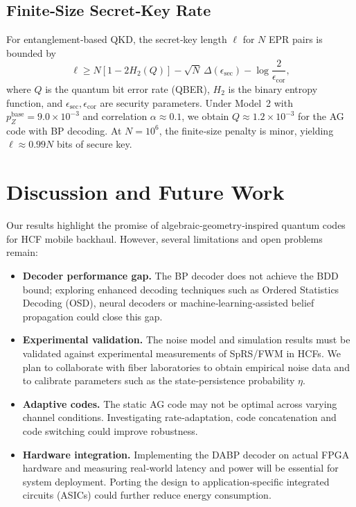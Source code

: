 \documentclass[conference]{IEEEtran}
\begin{document}
    \subsection{Finite‑Size Secret‑Key Rate}
    For entanglement‑based QKD, the secret‑key length $\ell$ for $N$ EPR pairs is bounded by
    \begin{equation}
    \ell \ge N[1-2H_2(Q)]-\sqrt{N}\,\Delta(\epsilon_{\mathrm{sec}}) - \log \frac{2}{\epsilon_{\mathrm{cor}}},
    \end{equation}
    where $Q$ is the quantum bit error rate (QBER), $H_2$ is the binary entropy function, and $\epsilon_{\mathrm{sec}}, 
\epsilon_{\mathrm{cor}}$ are security parameters.  Under Model 2 with $p_Z^{\mathrm{base}}=9.0\times 10^{-3}$ and 
correlation $\alpha\approx 0.1$, we obtain $Q\approx 1.2\times 10^{-3}$ for the AG code with BP decoding.  At $N=10^6$, 
the finite‑size penalty is minor, yielding $\ell\approx 0.99N$ bits of secure key.

    \section{Discussion and Future Work}

    Our results highlight the promise of algebraic‑geometry‑inspired quantum codes for HCF mobile backhaul.  However, 
several limitations and open problems remain:

    \begin{itemize}[leftmargin=*]
      \item \textbf{Decoder performance gap.}  The BP decoder does not achieve the BDD bound; exploring enhanced 
decoding techniques such as Ordered Statistics Decoding (OSD), neural decoders or machine‑learning‑assisted belief 
propagation could close this gap.
      \item \textbf{Experimental validation.}  The noise model and simulation results must be validated against 
experimental measurements of SpRS/FWM in HCFs.  We plan to collaborate with fiber laboratories to obtain empirical noise
 data and to calibrate parameters such as the state‑persistence probability $\eta$.
      \item \textbf{Adaptive codes.}  The static AG code may not be optimal across varying channel conditions.  
Investigating rate‑adaptation, code concatenation and code switching could improve robustness.
      \item \textbf{Hardware integration.}  Implementing the DABP decoder on actual FPGA hardware and measuring 
real‑world latency and power will be essential for system deployment.  Porting the design to application‑specific 
integrated circuits (ASICs) could further reduce energy consumption.
    \end{itemize}
\end{document}
